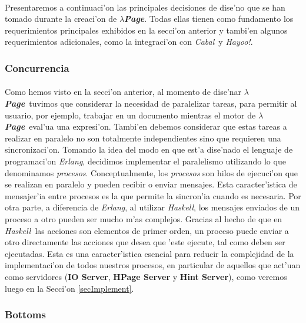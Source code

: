 \documentclass[a4paper]{article}
\newcommand{\haskell}{\textsl{Haskell}}
\newcommand{\hpage}{\textbf{\textsl{$\lambda$Page}}}
\newcommand{\cabal}{\textsl{Cabal}}
\begin{document}
\paragraph{}Presentaremos a continuaci'on las principales decisiones de dise'no que se han tomado durante la creaci'on de \hpage.  Todas ellas tienen como fundamento los requerimientos principales exhibidos en la secci'on anterior y tambi'en algunos requerimientos adicionales, como la integraci'on con \cabal\ y \textsl{Hayoo!}.
\subsubsection{Concurrencia}
\paragraph{}Como hemos visto en la secci'on anterior, al momento de dise'nar \hpage\ tuvimos que considerar la necesidad de paralelizar tareas, para permitir al usuario, por ejemplo, trabajar en un documento mientras el motor de \hpage\ eval'ua una expresi'on.  Tambi'en debemos considerar que estas tareas a realizar en paralelo no son totalmente independientes sino que requieren una sincronizaci'on.  Tomando la idea del modo en que est'a dise'nado el lenguaje de programaci'on \textsl{Erlang}, decidimos implementar el paralelismo utilizando lo que denominamos \textsl{procesos}.  Conceptualmente, los \textsl{procesos} son hilos de ejecuci'on que se realizan en paralelo y pueden recibir o enviar mensajes.   Esta caracter'istica de mensajer'ia entre procesos es la que permite la sincron'ia cuando es necesaria.  Por otra parte, a diferencia de \textsl{Erlang}, al utilizar \haskell, los mensajes enviados de un proceso a otro pueden ser mucho m'as complejos.  Gracias al hecho de que en \haskell\ las acciones son elementos de primer orden, un proceso puede enviar a otro directamente las acciones que desea que 'este ejecute, tal como deben ser ejecutadas.  Esta es una caracter'istica esencial para reducir la complejidad de la implementaci'on de todos nuestros procesos, en particular de aquellos que act'uan como servidores (\textbf{IO Server}, \textbf{HPage Server} y \textbf{Hint Server}), como veremos luego en la Secci'on \ref{secImplement}.
\subsubsection{Bottoms}
\end{document}
